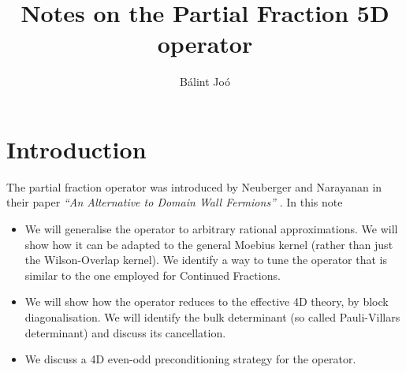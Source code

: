 \documentclass[12pt]{article}
\title{Notes on the Partial Fraction 5D operator}
\author{B\'alint Jo\'o}
\begin{document}
\maketitle
\newcommand{\gf}{\ensuremath{\gamma_5}}
\newcommand{\eps}{\ensuremath{\varepsilon}}
\abstract{ }
\section{Introduction}
The partial fraction operator was introduced by Neuberger and Narayanan
in their paper {\em ``An Alternative to Domain Wall Fermions''}
 \cite{NeubergerNarayanan}. In this note
\begin{itemize}
  \item
    We will generalise the operator to arbitrary rational approximations.
We will show how it can be adapted to the general Moebius kernel (rather
than just the Wilson-Overlap kernel). We identify a way to tune 
the operator that is similar to the one employed for Continued Fractions.
  \item
    We will show how the operator reduces to the effective 4D theory, by 
block diagonalisation. We will identify the bulk determinant (so called
Pauli-Villars determinant) and discuss its cancellation.
  \item
    We discuss a 4D even-odd preconditioning strategy for the operator.
\end{itemize}
\end{document}
